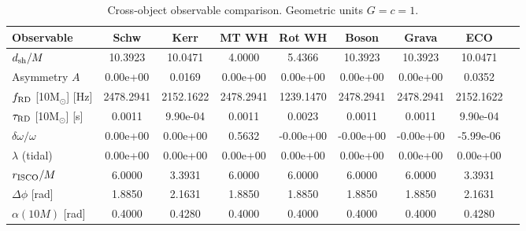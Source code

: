 \begin{table}[t]
\centering
\caption{Cross-object observable comparison. Geometric units $G=c=1$.}
\label{tab:comparison}
\begin{tabular}{l|cccccccc}
\toprule
Observable & Schw & Kerr & MT WH & Rot WH & Boson & Grava & ECO \\
\midrule
  $d_{\rm sh}/M$ & 10.3923 & 10.0471 & 4.0000 & 5.4366 & 10.3923 & 10.3923 & 10.0471 \\
  Asymmetry $A$ & 0.00e+00 & 0.0169 & 0.00e+00 & 0.00e+00 & 0.00e+00 & 0.00e+00 & 0.0352 \\
  $f_{\rm RD}$ [10M$_\odot$] [Hz] & 2478.2941 & 2152.1622 & 2478.2941 & 1239.1470 & 2478.2941 & 2478.2941 & 2152.1622 \\
  $\tau_{\rm RD}$ [10M$_\odot$] [s] & 0.0011 & 9.90e-04 & 0.0011 & 0.0023 & 0.0011 & 0.0011 & 9.90e-04 \\
  $\delta\omega/\omega$ & 0.00e+00 & 0.00e+00 & 0.5632 & -0.00e+00 & -0.00e+00 & -0.00e+00 & -5.99e-06 \\
  $\lambda$ (tidal) & 0.00e+00 & 0.00e+00 & 0.00e+00 & 0.00e+00 & 0.00e+00 & 0.00e+00 & 0.00e+00 \\
  $r_{\rm ISCO}/M$ & 6.0000 & 3.3931 & 6.0000 & 6.0000 & 6.0000 & 6.0000 & 3.3931 \\
  $\Delta\phi$ [rad] & 1.8850 & 2.1631 & 1.8850 & 1.8850 & 1.8850 & 1.8850 & 2.1631 \\
  $\alpha(10M)$ [rad] & 0.4000 & 0.4280 & 0.4000 & 0.4000 & 0.4000 & 0.4000 & 0.4280 \\
\bottomrule
\end{tabular}
\end{table}